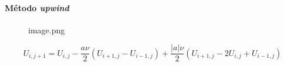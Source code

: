 \documentclass[11pt]{article}
\begin{document}
        

        
        
        

        
    \hypertarget{muxe9todo-upwind}{%
\paragraph{\texorpdfstring{Método
\emph{upwind}}{Método upwind}}}

    \begin{figure}
\centering
\caption{image.png}
\end{figure}

    \[U_{i,j+1} = U_{i,j} - \frac{a\nu}{2}(U_{i+1,j} - U_{i-1,j}) + \frac{|a|\nu}2(U_{i+1,j}-2U_{i,j}+U_{i-1,j})  \]
\end{document}
